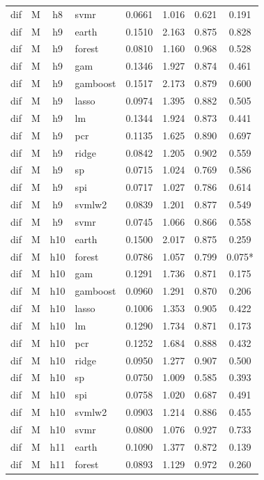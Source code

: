 \begin{ThreePartTable}
\begin{longtable}[t]{llclcccc}
dif & M & h8 & svmr & 0.0661 & 1.016 & 0.621 & 0.191\\
\addlinespace
dif & M & h9 & earth & 0.1510 & 2.163 & 0.875 & 0.828\\
dif & M & h9 & forest & 0.0810 & 1.160 & 0.968 & 0.528\\
dif & M & h9 & gam & 0.1346 & 1.927 & 0.874 & 0.461\\
dif & M & h9 & gamboost & 0.1517 & 2.173 & 0.879 & 0.600\\
dif & M & h9 & lasso & 0.0974 & 1.395 & 0.882 & 0.505\\
dif & M & h9 & lm & 0.1344 & 1.924 & 0.873 & 0.441\\
dif & M & h9 & pcr & 0.1135 & 1.625 & 0.890 & 0.697\\
dif & M & h9 & ridge & 0.0842 & 1.205 & 0.902 & 0.559\\
dif & M & h9 & sp & 0.0715 & 1.024 & 0.769 & 0.586\\
dif & M & h9 & spi & 0.0717 & 1.027 & 0.786 & 0.614\\
dif & M & h9 & svmlw2 & 0.0839 & 1.201 & 0.877 & 0.549\\
dif & M & h9 & svmr & 0.0745 & 1.066 & 0.866 & 0.558\\
\addlinespace
dif & M & h10 & earth & 0.1500 & 2.017 & 0.875 & 0.259\\
dif & M & h10 & forest & 0.0786 & 1.057 & 0.799 & 0.075*\\
dif & M & h10 & gam & 0.1291 & 1.736 & 0.871 & 0.175\\
dif & M & h10 & gamboost & 0.0960 & 1.291 & 0.870 & 0.206\\
dif & M & h10 & lasso & 0.1006 & 1.353 & 0.905 & 0.422\\
dif & M & h10 & lm & 0.1290 & 1.734 & 0.871 & 0.173\\
dif & M & h10 & pcr & 0.1252 & 1.684 & 0.888 & 0.432\\
dif & M & h10 & ridge & 0.0950 & 1.277 & 0.907 & 0.500\\
dif & M & h10 & sp & 0.0750 & 1.009 & 0.585 & 0.393\\
dif & M & h10 & spi & 0.0758 & 1.020 & 0.687 & 0.491\\
dif & M & h10 & svmlw2 & 0.0903 & 1.214 & 0.886 & 0.455\\
dif & M & h10 & svmr & 0.0800 & 1.076 & 0.927 & 0.733\\
\addlinespace
dif & M & h11 & earth & 0.1090 & 1.377 & 0.872 & 0.139\\
dif & M & h11 & forest & 0.0893 & 1.129 & 0.972 & 0.260\\

\end{longtable}
\end{ThreePartTable}
